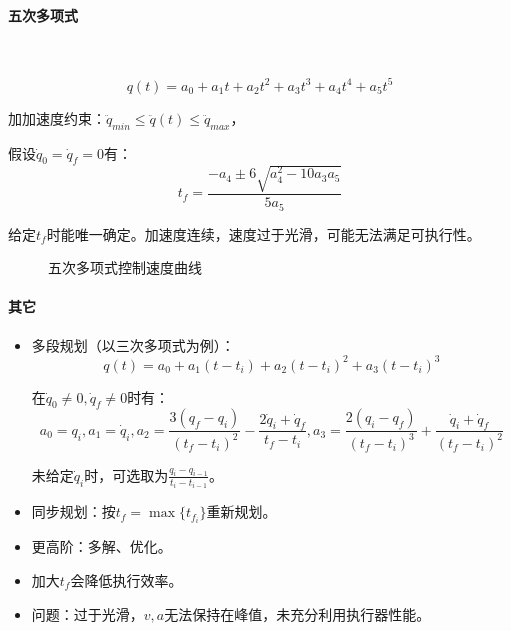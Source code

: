 \documentclass[
12pt, %
a4paper, 
oneside, %
headinclude,footinclude, %
]{scrartcl}
\begin{document}
\paragraph{五次多项式}~\\
\begin{minipage}{0.6\textwidth}
$$ q(t) = a_0 + a_1 t + a_2 t^2 + a_3 t^3 + a_4 t^4 + a_5 t^5 $$

\hspace{2em}
加加速度约束：$ \ddot{q}_{min} \leq \ddot{q}(t) \leq \ddot{q}_{max} $，

\hspace{2em}
假设$ \dot{q}_0 = \dot{q}_f = 0 $有：
$$ t_f = \frac{-a_4 \pm 6 \sqrt{a_4^2 - 10 a_3 a_5}}{5a_5} $$ 

\hspace{2em}
给定$ t_f $时能唯一确定。加速度连续，速度过于光滑，可能无法满足可执行性。
\end{minipage}
\begin{minipage}{0.4\textwidth}
\begin{figure}[H]
\centering
{}
\caption{五次多项式控制速度曲线}
\end{figure}
\end{minipage}
\paragraph{其它}
\begin{itemize}
\item 多段规划（以三次多项式为例）：
$$ q(t) = a_0 + a_1(t - t_i) + a_2(t - t_i)^2 + a_3(t - t_i)^3 $$

在$ \dot{q}_0 \neq 0, \dot{q}_f \neq 0 $时有：
$$ a_0 = q_i, a_1 = \dot{q}_i, a_2 = \frac{3(q_f - q_i)}{(t_f - t_i)^2} - \frac{2\dot{q}_i + \dot{q}_f}{t_f - t_i}, a_3 = \frac{2(q_i - q_f)}{(t_f - t_i)^3} + \frac{\dot{q}_i + \dot{q}_f}{(t_f - t_i)^2} $$

未给定$ \dot{q}_i $时，可选取为$ \frac{q_i - q_{i - 1}}{t_i - t_{i - 1}} $。
\item 同步规划：按$ t_f = \max\{t_{f_i}\} $重新规划。
\item 更高阶：多解、优化。
\item 加大$ t_f $会降低执行效率。
\item 问题：过于光滑，$ v, a $无法保持在峰值，未充分利用执行器性能。
\end{itemize}
\end{document}
